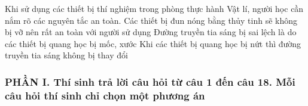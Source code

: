 \begin{ex}%
Khi sử dụng các thiết bị thí nghiệm trong phòng thực hành Vật lí, người học cần nắm rõ các nguyên tắc an toàn.
{Các thiết bị đun nóng bằng thủy tinh sẽ không bị vỡ nên rất an toàn với người sử dụng} 
{\True Đường truyền tia sáng bị sai lệch là do các thiết bị quang học bị mốc, xước} 
{Khi các thiết bị quang học bị nứt thì đường truyền tia sáng không bị thay đổi} 
\loigiai{ 
\begin{itemchoice}
\itemch
\itemch
\itemch
\itemch
\end{itemchoice}
}
\end{ex}















\subsubsection*{PHẦN I. Thí sinh trả lời câu hỏi từ câu 1 đến câu 18. Mỗi câu hỏi thí sinh chỉ chọn một phương án}
\setcounter{ex}{0}

